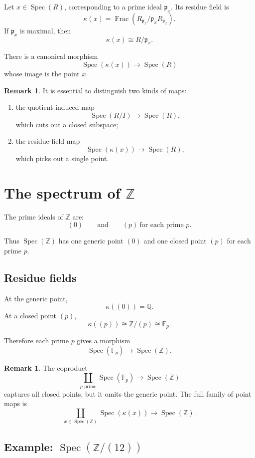 \documentclass[11pt]{article}
\theoremstyle{definition}
\newtheorem{remark}[theorem]{Remark}
\newcommand{\Z}{\mathbb{Z}}
\newcommand{\Q}{\mathbb{Q}}
\newcommand{\F}{\mathbb{F}}
\newcommand{\Spec}{\operatorname{Spec}}
\newcommand{\Frac}{\operatorname{Frac}}
\newcommand{\kk}[1]{\kappa\!\left(#1\right)}
\begin{document}
	Let \(x\in \Spec(R)\), corresponding to a prime ideal \(\mathfrak p_x\). Its residue field is
	\[
	\kk{x} = \Frac(R_{\mathfrak p_x}/\mathfrak p_xR_{\mathfrak p_x}).
	\]
	If \(\mathfrak p_x\) is maximal, then
	\[
	\kk{x}\cong R/\mathfrak p_x.
	\]
	
	There is a canonical morphism
	\[
	\Spec(\kk{x})\to \Spec(R)
	\]
	whose image is the point \(x\).
	
	\begin{remark}
		It is essential to distinguish two kinds of maps:
		
		\begin{enumerate}[label=\textbf{(\alph*)}]
			\item the quotient-induced map
			\[
			\Spec(R/I)\to \Spec(R),
			\]
			which cuts out a closed subspace;
			
			\item the residue-field map
			\[
			\Spec(\kk{x})\to \Spec(R),
			\]
			which picks out a single point.
		\end{enumerate}
	\end{remark}
	
	\section{The spectrum of \(\Z\)}
	
	The prime ideals of \(\Z\) are:
	\[
	(0)
	\qquad\text{and}\qquad
	(p)\ \text{for each prime }p.
	\]
	
	Thus \(\Spec(\Z)\) has one generic point \((0)\) and one closed point \((p)\) for each prime \(p\).
	
	\subsection{Residue fields}
	
	At the generic point,
	\[
	\kk{(0)}=\Q.
	\]
	At a closed point \((p)\),
	\[
	\kk{(p)}\cong \Z/(p)\cong \F_p.
	\]
	
	Therefore each prime \(p\) gives a morphism
	\[
	\Spec(\F_p)\to \Spec(\Z).
	\]
	
	\begin{remark}
		The coproduct
		\[
		\coprod_{p\text{ prime}}\Spec(\F_p)\to \Spec(\Z)
		\]
		captures all closed points, but it omits the generic point. The full family of point maps is
		\[
		\coprod_{x\in \Spec(\Z)}\Spec(\kk{x})\to \Spec(\Z).
		\]
	\end{remark}
	
	\subsection{Example: \(\Spec(\Z/(12))\)}
	
\end{document}
